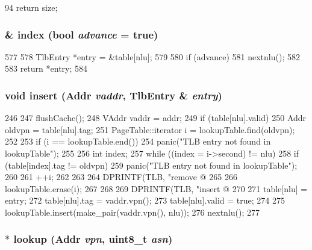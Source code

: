 \begin{DoxyCode}
94 { return size; }
\end{DoxyCode}
\hypertarget{classAlphaISA_1_1TLB_ab208f0d14ee1cc1eb06a1b6e6f1bd1b9}{
\subsubsection[{index}]{ \& index (bool {\em advance} = {\ttfamily true})}}
\label{classAlphaISA_1_1TLB_ab208f0d14ee1cc1eb06a1b6e6f1bd1b9}



\begin{DoxyCode}
577 {
578     TlbEntry *entry = &table[nlu];
579 
580     if (advance)
581         nextnlu();
582 
583     return *entry;
584 }
\end{DoxyCode}
\hypertarget{classAlphaISA_1_1TLB_a47905393ad1ab88c483d3f512327aedc}{
\subsubsection[{insert}]{\setlength{\rightskip}{0pt plus 5cm}void insert ({\bf Addr} {\em vaddr}, \/  {\bf TlbEntry} \& {\em entry})}}
\label{classAlphaISA_1_1TLB_a47905393ad1ab88c483d3f512327aedc}



\begin{DoxyCode}
246 {
247     flushCache();
248     VAddr vaddr = addr;
249     if (table[nlu].valid) {
250         Addr oldvpn = table[nlu].tag;
251         PageTable::iterator i = lookupTable.find(oldvpn);
252 
253         if (i == lookupTable.end())
254             panic("TLB entry not found in lookupTable");
255 
256         int index;
257         while ((index = i->second) != nlu) {
258             if (table[index].tag != oldvpn)
259                 panic("TLB entry not found in lookupTable");
260 
261             ++i;
262         }
263 
264         DPRINTF(TLB, "remove @%
265 
266         lookupTable.erase(i);
267     }
268 
269     DPRINTF(TLB, "insert @%
270 
271     table[nlu] = entry;
272     table[nlu].tag = vaddr.vpn();
273     table[nlu].valid = true;
274 
275     lookupTable.insert(make_pair(vaddr.vpn(), nlu));
276     nextnlu();
277 }
\end{DoxyCode}
\hypertarget{classAlphaISA_1_1TLB_af2081108994a71d701fc459ad161790e}{
\subsubsection[{lookup}]{ $\ast$ lookup ({\bf Addr} {\em vpn}, \/  uint8\_\-t {\em asn})}}
\label{classAlphaISA_1_1TLB_af2081108994a71d701fc459ad161790e}



